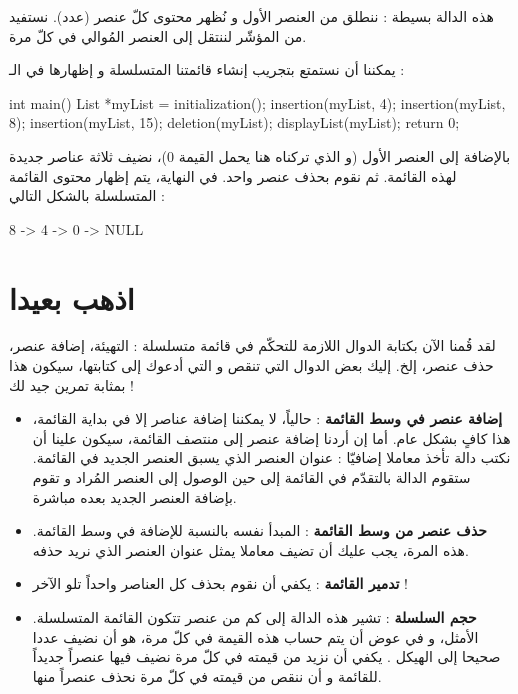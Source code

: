 هذه الدالة بسيطة : ننطلق من العنصر الأول و نُظهر محتوى كلّ عنصر (عدد). نستفيد من المؤشّر 
لننتقل إلى العنصر المُوالي في كلّ مرة.

يمكننا أن نستمتع بتجريب إنشاء قائمتنا المتسلسلة و إظهارها في الـ :

\begin{Csource}
int main()
{
	List *myList = initialization();
	insertion(myList, 4);
	insertion(myList, 8);
	insertion(myList, 15);
	deletion(myList);
	displayList(myList);
	return 0;
}
\end{Csource}

بالإضافة إلى العنصر الأول (و الذي تركناه هنا يحمل القيمة 0)، نضيف ثلاثة عناصر جديدة لهذه القائمة. ثم نقوم بحذف عنصر واحد. في النهاية، يتم إظهار محتوى القائمة المتسلسلة بالشكل التالي :

\begin{Console}
8 -> 4 -> 0 -> NULL
\end{Console}


\section{اذهب بعيدا}

 لقد قُمنا الآن بكتابة الدوال اللازمة للتحكّم في قائمة متسلسلة : التهيئة، إضافة عنصر، حذف عنصر، إلخ. إليك بعض الدوال التي تنقص و التي أدعوك إلى كتابتها، سيكون هذا بمثابة تمرين جيد لك !

\begin{itemize}
	\item \textbf{إضافة عنصر في وسط القائمة} :
	حالياً، لا يمكننا إضافة عناصر إلا في بداية القائمة، هذا كافٍ بشكل عام. أما إن أردنا إضافة عنصر إلى منتصف القائمة، سيكون علينا أن نكتب دالة تأخذ معاملا إضافيّا : عنوان العنصر الذي يسبق العنصر الجديد في القائمة. ستقوم الدالة بالتقدّم في القائمة إلى حين الوصول إلى العنصر المُراد و تقوم بإضافة العنصر الجديد بعده مباشرة.
	\item \textbf{حذف عنصر من وسط القائمة} :
	المبدأ نفسه بالنسبة للإضافة في وسط القائمة. هذه المرة، يجب عليك أن تضيف معاملا يمثل عنوان العنصر الذي نريد حذفه.
	\item \textbf{تدمير القائمة} :
	يكفي أن نقوم بحذف كل العناصر واحداً تلو الآخر !
	\item \textbf{حجم السلسلة} :
	تشير هذه الدالة إلى كم من عنصر تتكون القائمة المتسلسلة. الأمثل، و في عوض أن يتم حساب هذه القيمة في كلّ مرة، هو أن نضيف عددا صحيحا
	إلى الهيكل
	.
	يكفي أن نزيد من قيمته في كلّ مرة نضيف فيها عنصراً جديداً للقائمة و أن ننقص من قيمته في كلّ مرة نحذف عنصراً منها.
\end{itemize}

